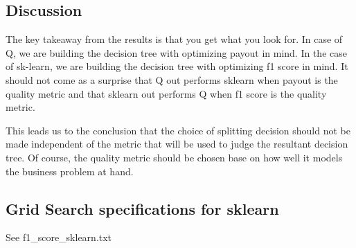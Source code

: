 \subsection{Discussion}

The key takeaway from the results is that you get what you look for. In case of
Q, we are building the decision tree with optimizing payout in mind. In the case
of sk-learn, we are building the decision tree with optimizing f1 score in mind.
It should not come as a surprise that Q out performs sklearn when payout is the
quality metric and that sklearn out performs Q when f1 score is the quality
metric.

This leads us to the conclusion that the choice of splitting decision 
should not be made independent of the metric that will be used to judge the
resultant decision tree. Of course, the quality metric should be chosen
base on how well it models the business problem at hand.

\subsection{Grid Search specifications for sklearn}

See f1_score_sklearn.txt \TBC



